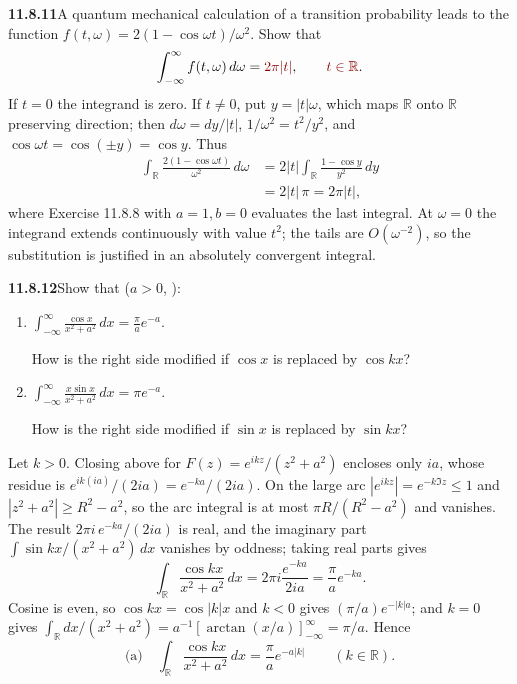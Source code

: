 \par\bigskip
\noindent\textbf{11.8.11}\quad A quantum mechanical calculation of a
transition probability leads to the function
$f(t,\omega)=2(1-\cos\omega t)/\omega^{2}$. Show that
\[
\int_{-\infty}^{\infty}f(t,\omega)\,d\omega=\erratum{2\pi|t|},\qquad\erratum{t\in\mathbb R}.
\]
\solution
{}
If $t=0$ the integrand is zero. If $t\ne0$, put $y=|t|\omega$, which
maps $\mathbb R$ onto $\mathbb R$ preserving direction;
then $d\omega=dy/|t|$, $1/\omega^2=t^2/y^2$, and
$\cos\omega t=\cos(\pm y)=\cos y$. Thus
\[
\begin{aligned}
\int_{\mathbb R}\frac{2(1-\cos\omega t)}{\omega^2}\,d\omega
&=2|t|\int_{\mathbb R}\frac{1-\cos y}{y^2}\,dy\\
&=2|t|\,\pi=\boxed{2\pi|t|},
\end{aligned}
\]
where Exercise 11.8.8 with $a=1,b=0$ evaluates the last integral.
At $\omega=0$ the integrand extends continuously with value $t^2$;
the tails are $O(\omega^{-2})$, so the substitution is justified
in an absolutely convergent integral.

\par\bigskip
\noindent\textbf{11.8.12}\quad Show that ($a>0$, ):
\begin{enumerate}
\item[(a)] $\displaystyle\int_{-\infty}^{\infty}\frac{\cos x}{x^{2}+a^{2}}\,dx
  =\frac{\pi}{a}e^{-a}$.\par
  How is the right side modified if $\cos x$ is replaced by $\cos kx$?
\item[(b)] $\displaystyle\int_{-\infty}^{\infty}\frac{x\sin x}{x^{2}+a^{2}}\,dx
  =\pi e^{-a}$.\par
  How is the right side modified if $\sin x$ is replaced by $\sin kx$?
\end{enumerate}
\solution
{}
Let $k>0$. Closing above for
$F(z)=e^{ikz}/(z^2+a^2)$ encloses only $ia$, whose residue is
$e^{ik(ia)}/(2ia)=e^{-ka}/(2ia)$. On the large arc
$|e^{ikz}|=e^{-k\Im z}\le1$ and $|z^2+a^2|\ge R^2-a^2$, so the arc
integral is at most $\pi R/(R^2-a^2)$ and vanishes. The result
$2\pi i\,e^{-ka}/(2ia)$ is real, and the imaginary part
$\int\sin kx/(x^2+a^2)\,dx$ vanishes by oddness; taking real parts gives
\[
\int_{\mathbb R}\frac{\cos kx}{x^2+a^2}\,dx
=2\pi i\frac{e^{-ka}}{2ia}=\frac{\pi}{a}e^{-ka}.
\]
Cosine is even, so $\cos kx=\cos|k|x$ and $k<0$ gives
$(\pi/a)e^{-|k|a}$; and $k=0$ gives
$\int_{\mathbb R}dx/(x^2+a^2)=a^{-1}[\arctan(x/a)]_{-\infty}^{\infty}=\pi/a$.
Hence
\[
\boxed{\text{(a)}\quad
\int_{\mathbb R}\frac{\cos kx}{x^2+a^2}\,dx
=\frac{\pi}{a}e^{-a|k|}\qquad(k\in\mathbb R).}
\]

